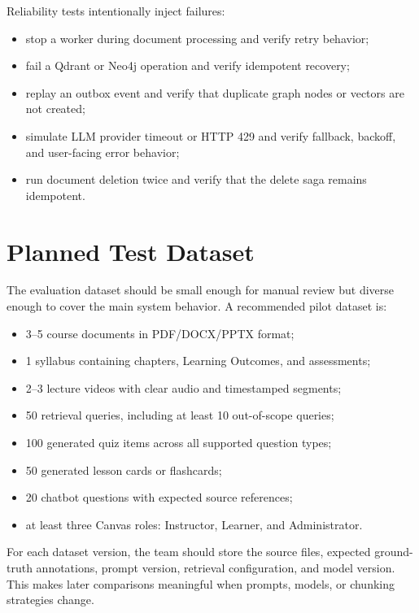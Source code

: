 Reliability tests intentionally inject failures:

\begin{itemize}
    \item stop a worker during document processing and verify retry behavior;
    \item fail a Qdrant or Neo4j operation and verify idempotent recovery;
    \item replay an outbox event and verify that duplicate graph nodes or
          vectors are not created;
    \item simulate LLM provider timeout or HTTP 429 and verify fallback,
          backoff, and user-facing error behavior;
    \item run document deletion twice and verify that the delete saga remains
          idempotent.
\end{itemize}

\section{Planned Test Dataset}

The evaluation dataset should be small enough for manual review but diverse
enough to cover the main system behavior. A recommended pilot dataset is:

\begin{itemize}
    \item 3--5 course documents in PDF/DOCX/PPTX format;
    \item 1 syllabus containing chapters, Learning Outcomes, and assessments;
    \item 2--3 lecture videos with clear audio and timestamped segments;
    \item 50 retrieval queries, including at least 10 out-of-scope queries;
    \item 100 generated quiz items across all supported question types;
    \item 50 generated lesson cards or flashcards;
    \item 20 chatbot questions with expected source references;
    \item at least three Canvas roles: Instructor, Learner, and Administrator.
\end{itemize}

For each dataset version, the team should store the source files, expected
ground-truth annotations, prompt version, retrieval configuration, and model
version. This makes later comparisons meaningful when prompts, models, or
chunking strategies change.

